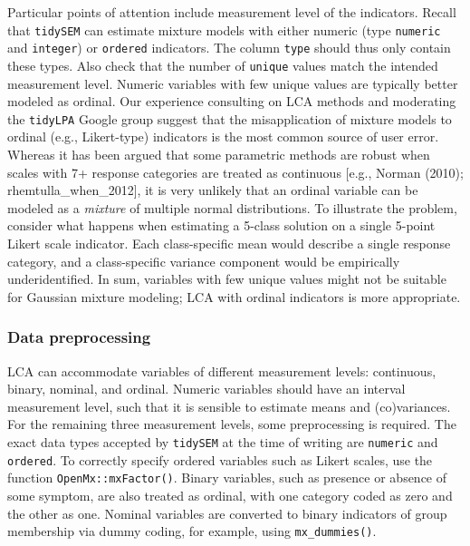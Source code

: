 \documentclass[
  ,man,floatsintext]{apa6}
\begin{document}
Particular points of attention include measurement level of the indicators.
Recall that \texttt{tidySEM} can estimate mixture models with either numeric (type \texttt{numeric} and \texttt{integer}) or \texttt{ordered} indicators.
The column \texttt{type} should thus only contain these types.
Also check that the number of \texttt{unique} values match the intended measurement level.
Numeric variables with few unique values are typically better modeled as ordinal.
Our experience consulting on LCA methods
and moderating the \texttt{tidyLPA} Google group suggest that the
misapplication of mixture models to ordinal (e.g., Likert-type)
indicators is the most common source of user error. Whereas it has been
argued that some parametric methods are robust when scales with 7+
response categories are treated as continuous {[}e.g., Norman (2010); rhemtulla\_when\_2012{]},
it is very unlikely
that an ordinal variable can be modeled as a \emph{mixture} of multiple
normal distributions.
To illustrate the problem, consider what happens when estimating a 5-class solution on a single 5-point Likert scale indicator.
Each class-specific mean would describe a single response
category,
and a class-specific variance component would be empirically underidentified.
In sum, variables with few unique values might not be suitable for Gaussian mixture modeling;
LCA with ordinal indicators is more appropriate.

\hypertarget{data-preprocessing}{%
\subsubsection{Data preprocessing}\label{data-preprocessing}}

LCA can accommodate variables of different measurement levels: continuous, binary, nominal, and ordinal.
Numeric variables should have an interval measurement level,
such that it is sensible to estimate means and (co)variances.
For the remaining three measurement levels,
some preprocessing is required.
The exact data types accepted by \texttt{tidySEM} at the time of writing are \texttt{numeric} and \texttt{ordered}.
To correctly specify ordered variables
such as Likert scales,
use the function \texttt{OpenMx::mxFactor()}.
Binary variables,
such as presence or absence of some symptom, are also treated as ordinal, with one category coded as zero and the other as one.
Nominal variables are converted to binary indicators of group membership via dummy coding, for example, using \texttt{mx\_dummies()}.
\end{document}
